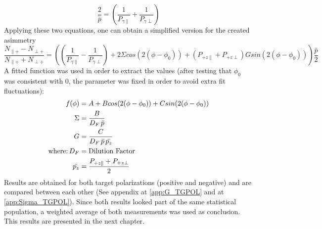 \begin{equation}
  \frac{2}{\bar{p}} = \left(\frac{1}{P_{\gamma \parallel}} + \frac{1}{P_{\gamma \perp}}\right)
\end{equation}
Applying these two equations, one can obtain a simplified version for the created asimmetry
\begin{equation}
  \frac{N_{\parallel +} - N_{\perp +}}{N_{\parallel +} + N_{\perp +}} = \left( (\frac{1}{P_{\gamma \parallel}} - \frac{1}{P_{\gamma \perp}}) + 2 \Sigma cos(2(\phi-\phi_0)) +  (P_{+z\parallel}+P_{+z\perp}) G sin(2(\phi-\phi_0)) \right) \frac{\bar{p}}{2} \label{eq:A2}
\end{equation}
A fitted function was used in order to extract the values (after testing that $\phi_0$ was consistent with 0, the parameter was fixed in order to avoid extra fit fluctuations):
\begin{align}
  f(\phi) & = A + B cos(2(\phi-\phi_0)) + C sin(2(\phi-\phi_0)) \\
  \Sigma & = \frac{B}{D_F \, \bar{p}} \\
  G & = \frac{C}{D_F \, \bar{p} \,\bar{p_z}} \\
    \textnormal{where:} \, D_F & =   \textnormal{Dilution Factor} \\
    \bar{p_z} & =  \frac{P_{+z\parallel}+P_{+z\perp}}{2}
\end{align}
Results are obtained for both target polarizations (positive and negative) and are compared between each other (See appendix at \ref{app:G_TGPOL} and at \ref{app:Sigma_TGPOL}). Since both results looked part of the same statistical population, a weighted average of both measurements was used as conclusion. This results are presented in the next chapter.
